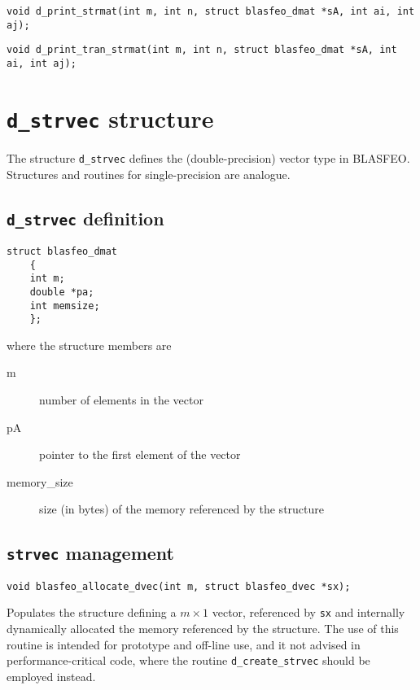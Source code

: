\documentclass[a4paper]{report}
\begin{document}
\begin{verbatim}
void d_print_strmat(int m, int n, struct blasfeo_dmat *sA, int ai, int aj);
\end{verbatim}

\begin{verbatim}
void d_print_tran_strmat(int m, int n, struct blasfeo_dmat *sA, int ai, int aj);
\end{verbatim}



\section{{\tt d\_strvec} structure}

The structure {\tt d\_strvec} defines the (double-precision) vector type in BLASFEO.
Structures and routines for single-precision are analogue.



\subsection{{\tt d\_strvec} definition}

\begin{verbatim}
struct blasfeo_dmat 
    {
    int m;
    double *pa;
    int memsize;
    };
\end{verbatim}
where the structure members are
\begin{description}
\item[m] number of elements in the vector
\item[pA] pointer to the first element of the vector
\item[memory\_size] size (in bytes) of the memory referenced by the structure
\end{description}



\subsection{{\tt strvec} management}

\begin{verbatim}
void blasfeo_allocate_dvec(int m, struct blasfeo_dvec *sx);
\end{verbatim}
Populates the structure defining a $m\times 1$ vector, referenced by {\tt sx} and internally dynamically allocated the memory referenced by the structure.
The use of this routine is intended for prototype and off-line use, and it not advised in performance-critical code, where the routine {\tt d\_create\_strvec} should be employed instead.
\end{document}
